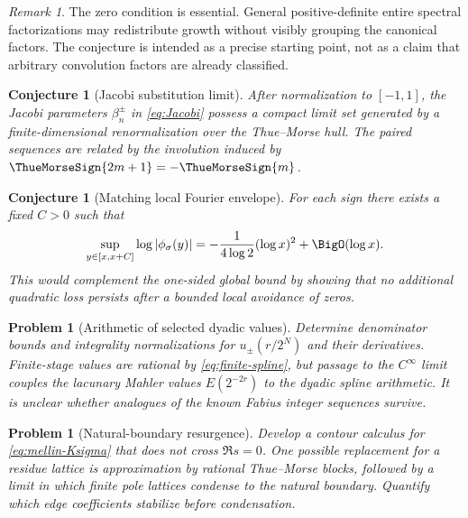 \documentclass[11pt,oneside]{article}
\numberwithin{equation}{section}
\newtheorem{conjecture}[theorem]{Conjecture}
\newtheorem{problem}[theorem]{Problem}
\theoremstyle{definition}
\theoremstyle{remark}
\newtheorem{remark}[theorem]{Remark}
\begin{document}
\begin{remark}
The zero condition is essential.  General positive-definite entire spectral factorizations
may redistribute growth without visibly grouping the canonical factors.  The conjecture
is intended as a precise starting point, not as a claim that arbitrary convolution factors
are already classified.
\end{remark}

\begin{conjecture}[Jacobi substitution limit]
\label{conj:Jacobi}
After normalization to $[-1,1]$, the Jacobi parameters $\beta_n^\pm$ in
\eqref{eq:Jacobi} possess a compact limit set generated by a finite-dimensional
renormalization over the Thue--Morse hull.  The paired sequences are related by the
involution induced by $\ThueMorseSign{2m+1}=-\ThueMorseSign{m}$.
\end{conjecture}

\begin{conjecture}[Matching local Fourier envelope]
\label{conj:Fourier-envelope}
For each sign there exists a fixed $C>0$ such that
\begin{equation}
 \sup_{y\in[x,x+C]}\log|\phi_\sigma(y)|
 =-\frac1{4\log2}(\log x)^2+\BigO(\log x).
 \label{eq:local-envelope}
\end{equation}
This would complement the one-sided global bound by showing that no additional quadratic
loss persists after a bounded local avoidance of zeros.
\end{conjecture}

\begin{problem}[Arithmetic of selected dyadic values]
Determine denominator bounds and integrality normalizations for
$u_\pm(r/2^N)$ and their derivatives.  Finite-stage values are rational by
\eqref{eq:finite-spline}, but passage to the $C^\infty$ limit couples the lacunary Mahler
values $E(2^{-2r})$ to the dyadic spline arithmetic.  It is unclear whether analogues of
the known Fabius integer sequences survive.
\end{problem}

\begin{problem}[Natural-boundary resurgence]
Develop a contour calculus for \eqref{eq:mellin-Ksigma} that does not cross
$\Re s=0$.  One possible replacement for a residue lattice is approximation by rational
Thue--Morse blocks, followed by a limit in which finite pole lattices condense to the
natural boundary.  Quantify which edge coefficients stabilize before condensation.
\end{problem}
\end{document}
